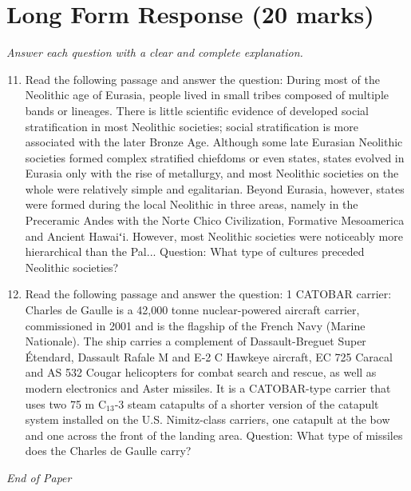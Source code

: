 \documentclass[12pt]{article}
\begin{document}
\section*{Long Form Response (20 marks)}
\textit{Answer each question with a clear and complete explanation.}
\begin{enumerate}[label=\arabic*.]
\setcounter{enumi}{10}
\item Read the following passage and answer the question: During most of the Neolithic age of Eurasia, people lived in small tribes composed of multiple bands or lineages. There is little scientific evidence of developed social stratification in most Neolithic societies; social stratification is more associated with the later Bronze Age. Although some late Eurasian Neolithic societies formed complex stratified chiefdoms or even states, states evolved in Eurasia only with the rise of metallurgy, and most Neolithic societies on the whole were relatively simple and egalitarian. Beyond Eurasia, however, states were formed during the local Neolithic in three areas, namely in the Preceramic Andes with the Norte Chico Civilization, Formative Mesoamerica and Ancient Hawaiʻi. However, most Neolithic societies were noticeably more hierarchical than the Pal... Question: What type of cultures preceded Neolithic societies?
\item Read the following passage and answer the question: 1 CATOBAR carrier: Charles de Gaulle is a 42,000 tonne nuclear-powered aircraft carrier, commissioned in 2001 and is the flagship of the French Navy (Marine Nationale). The ship carries a complement of Dassault-Breguet Super Étendard, Dassault Rafale M and E‑2 C Hawkeye aircraft, EC 725 Caracal and AS 532 Cougar helicopters for combat search and rescue, as well as modern electronics and Aster missiles. It is a CATOBAR-type carrier that uses two 75 m C$_{13}$‑3 steam catapults of a shorter version of the catapult system installed on the U.S. Nimitz-class carriers, one catapult at the bow and one across the front of the landing area. Question: What type of missiles does the Charles de Gaulle carry?
\end{enumerate}

\vfill
\noindent\textit{End of Paper}
\end{document}
